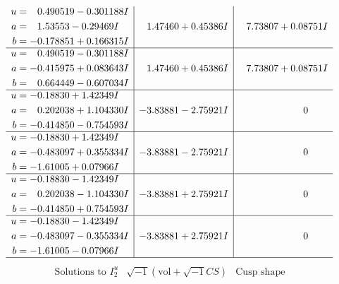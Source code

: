 \documentclass[1p]{elsarticle_modified}
\theoremstyle{definition}
\newcommand{\I}{\sqrt{-1}}
\begin{document}
$$\begin{array}{c|c|c}
\begin{aligned}
u &= \phantom{-}0.490519 - 0.301188 I \\
a &= \phantom{-}1.53553 - 0.29469 I \\
b &= -0.178851 + 0.166315 I\end{aligned}
 & \phantom{-}1.47460 + 0.45386 I & \phantom{-}7.73807 + 0.08751 I \\ \hline\begin{aligned}
u &= \phantom{-}0.490519 - 0.301188 I \\
a &= -0.415975 + 0.083643 I \\
b &= \phantom{-}0.664449 - 0.607034 I\end{aligned}
 & \phantom{-}1.47460 + 0.45386 I & \phantom{-}7.73807 + 0.08751 I \\ \hline\begin{aligned}
u &= -0.18830 + 1.42349 I \\
a &= \phantom{-}0.202038 + 1.104330 I \\
b &= -0.414850 - 0.754593 I\end{aligned}
 & -3.83881 - 2.75921 I & \phantom{-0.000000 } 0 \\ \hline\begin{aligned}
u &= -0.18830 + 1.42349 I \\
a &= -0.483097 + 0.355334 I \\
b &= -1.61005 + 0.07966 I\end{aligned}
 & -3.83881 - 2.75921 I & \phantom{-0.000000 } 0 \\ \hline\begin{aligned}
u &= -0.18830 - 1.42349 I \\
a &= \phantom{-}0.202038 - 1.104330 I \\
b &= -0.414850 + 0.754593 I\end{aligned}
 & -3.83881 + 2.75921 I & \phantom{-0.000000 } 0 \\ \hline\begin{aligned}
u &= -0.18830 - 1.42349 I \\
a &= -0.483097 - 0.355334 I \\
b &= -1.61005 - 0.07966 I\end{aligned}
 & -3.83881 + 2.75921 I & \phantom{-0.000000 } 0\\
 \hline 
 \end{array}$$\newpage$$\begin{array}{c|c|c}  
\text{Solutions to }I^u_{2}& \I (\text{vol} + \sqrt{-1}CS) & \text{Cusp shape}\\
 \hline 
\begin{aligned}

\end{aligned}
\end{array}$$
\end{document}
